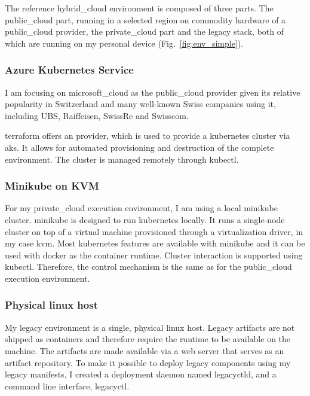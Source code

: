 \documentclass[../main.tex]{subfiles}
\begin{document}
    The reference \gls{hybrid_cloud} environment is composed of three parts.
    The \gls{public_cloud} part, running in a selected region on commodity hardware of a \gls{public_cloud} provider, the \gls{private_cloud} part and the legacy stack, both of which are running on my personal device (Fig.~\ref{fig:env_simple}).

    

    \subsubsection{Azure Kubernetes Service}

    I am focusing on \gls{microsoft_cloud} as the \gls{public_cloud} provider given its relative popularity in Switzerland and many well-known Swiss companies using it, including UBS, Raiffeisen, SwissRe and Swisscom.\cite{microsoft_exand_swiss,microsoft_ubs,microsoft_azure_case}

    \gls{terraform} offers an  provider, which is used to provide a \gls{kubernetes} cluster via \acrlong{aks}.
    It allows for automated provisioning and destruction of the complete environment.
    The cluster is managed remotely through \gls{kubectl}.

    \subsubsection{Minikube on KVM}

    For my \gls{private_cloud} execution environment, I am using a local \gls{minikube} cluster.
    \Gls{minikube} is designed to run \gls{kubernetes} locally.
    It runs a single-node cluster on top of a virtual machine provisioned through a virtualization driver, in my case \acrfull{kvm}.
    Most \gls{kubernetes} features are available with \gls{minikube} and it can be used with \gls{docker} as the container runtime.
    Cluster interaction is supported using \gls{kubectl}.
    Therefore, the control mechanism is the same as for the \gls{public_cloud} execution environment.\cite{k8s_dist_minikube}

    \subsubsection{Physical linux host}

    My legacy environment is a single, physical linux host.
    Legacy artifacts are not shipped as containers and therefore require the runtime to be available on the machine.
    The artifacts are made available via a web server that serves as an artifact repository.
    To make it possible to deploy legacy components using my legacy manifests, I created a deployment daemon named \gls{legacyctld}, and a command line interface, \gls{legacyctl}.
\end{document}
